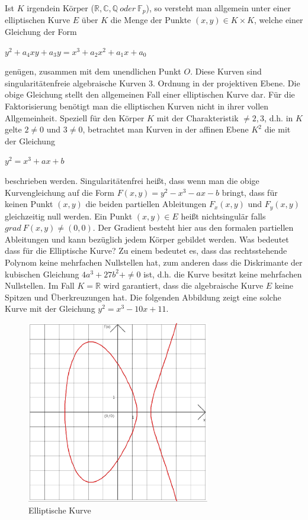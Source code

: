 \documentclass[a4paper,11pt]{article}
\begin{document}
Ist $K$ irgendein Körper ($\mathbb R,\mathbb C,\mathbb Q\ oder\ \mathbb F_p $),
so versteht man allgemein unter einer elliptischen
Kurve $E$ über $K$ die Menge der Punkte $(x,y) \in K \times K$, welche einer 
Gleichung der Form
\begin{center}
$y^2 + a_4xy + a_3y = x^3 + a_2x^2+a_1x+a_0$ 
\end{center} 
genügen, zusammen mit dem unendlichen Punkt $O$. 
Diese Kurven sind singularitätenfreie algebraische Kurven 3. Ordnung
in der projektiven Ebene. Die obige Gleichung stellt den allgemeinen Fall
einer elliptischen Kurve dar. Für die Faktorisierung benötigt man die 
elliptischen Kurven nicht in ihrer vollen Allgemeinheit. Speziell für den 
Körper $K$ mit der Charakteristik $\neq 2,3$, d.h. in $K$ gelte $2\neq0$
und $3\neq0$, betrachtet man Kurven in der affinen Ebene $K^2$ die mit der 
Gleichung 
\begin{center}
$y^2 = x^3 + ax+b$ 
\end{center} 
beschrieben werden. Singularitätenfrei heißt, dass wenn man die obige 
Kurvengleichung auf die Form $F(x,y) = y^2 - x^3 - ax - b$ bringt,
dass für keinen Punkt $(x,y)$ die beiden partiellen Ableitungen $F_x(x,y)$ und
$F_y(x,y)$ gleichzeitig null werden. Ein Punkt $(x,y) \in E$ heißt nichtsingulär
falls $grad\ F(x,y) \neq (0,0)$. Der Gradient besteht hier aus den formalen
partiellen Ableitungen und kann bezüglich jedem Körper gebildet werden. Was 
bedeutet dass für die Elliptische Kurve? Zu einem bedeutet es, dass das 
rechtsstehende Polynom keine mehrfachen Nullstellen hat, zum anderen dass die 
Diskrimante der kubischen Gleichung $4a^3+27b^2+\neq0$ ist, d.h. die Kurve
besitzt keine mehrfachen Nullstellen. Im Fall $K=\mathbb R$ wird garantiert, 
dass die algebraische Kurve $E$ keine Spitzen und Überkreuzungen hat. Die 
folgenden Abbildung zeigt eine solche Kurve mit der Gleichung $y^2 = x^3-10x+11$.
\begin{figure}[ht]
\begin{center}
\includegraphics[width=8cm]{ec-1.eps}
\caption{Elliptische Kurve}
\end{center}
\end{figure}
\end{document}
